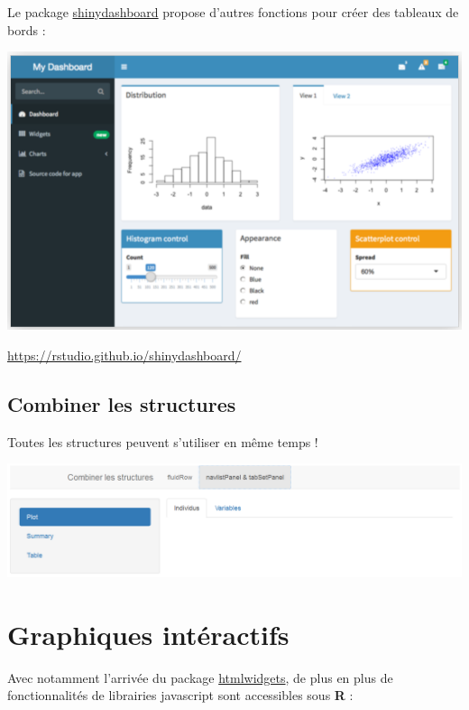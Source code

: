 \documentclass[]{article}
\begin{document}
Le package
\href{https://rstudio.github.io/shinydashboard/}{shinydashboard} propose
d'autres fonctions pour créer des tableaux de bords :

\includegraphics{img/dash.png}

\url{https://rstudio.github.io/shinydashboard/}

\subsection{Combiner les structures}\label{combiner-les-structures}

Toutes les structures peuvent s'utiliser en même temps !

\includegraphics{img/struct.png}

\section{Graphiques intéractifs}\label{graphiques-interactifs}

Avec notamment l'arrivée du package
\href{http://www.htmlwidgets.org/}{htmlwidgets}, de plus en plus de
fonctionnalités de librairies javascript sont accessibles sous
\textbf{R} :
\end{document}
